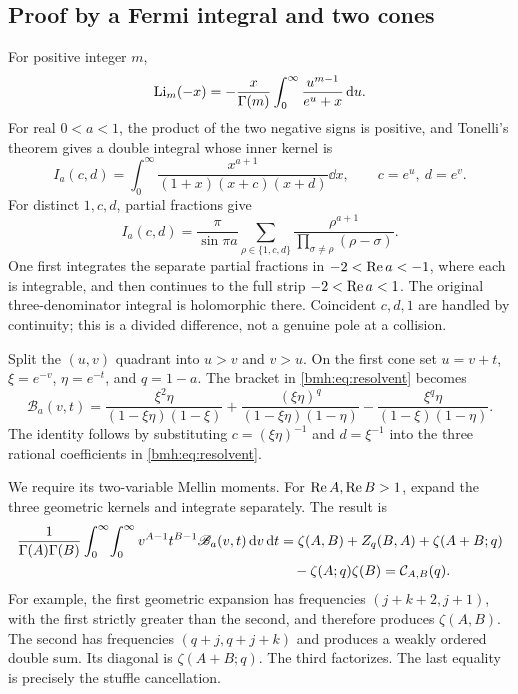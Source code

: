 \subsection{Proof by a Fermi integral and two cones}
For positive integer $m$,
\begin{equation}\label{bmh:eq:Fermi}
 \operatorname{Li}_m(-x)=-\frac{x}{\Gamma(m)}\int_0^\infty
             \frac{u^{m-1}}{e^u+x}\,\mathrm d u.
\end{equation}
For real $0<a<1$, the product of the two negative signs is positive,
and Tonelli's theorem gives a double integral whose inner kernel is
\[
 I_a(c,d)=\int_0^\infty
       \frac{x^{a+1}}{(1+x)(x+c)(x+d)}\dd x,
 \qquad c=e^u,\ d=e^v.
\]
For distinct $1,c,d$, partial fractions give
\begin{equation}\label{bmh:eq:resolvent}
 I_a(c,d)=\frac\pi{\sin\pi a}
 \sum_{\rho\in\{1,c,d\}}
       \frac{\rho^{a+1}}{\prod_{\sigma\ne\rho}(\rho-\sigma)}.
\end{equation}
One first integrates the separate partial fractions in
$-2<\operatorname{Re} a<-1$, where each is integrable, and then continues to the
full strip $-2<\operatorname{Re} a<1$. The original three-denominator integral is
holomorphic there. Coincident $c,d,1$ are handled by continuity; this is
a divided difference, not a genuine pole at a collision.

Split the $(u,v)$ quadrant into $u>v$ and $v>u$. On the first cone set
$u=v+t$, $\xi=e^{-v}$, $\eta=e^{-t}$, and $q=1-a$. The bracket in
\eqref{bmh:eq:resolvent} becomes
\begin{equation}\label{bmh:eq:cone-kernel}
 \mathscr B_a(v,t)=
 \frac{\xi^2\eta}{(1-\xi\eta)(1-\xi)}
 +\frac{(\xi\eta)^q}{(1-\xi\eta)(1-\eta)}
 -\frac{\xi^q\eta}{(1-\xi)(1-\eta)}.
\end{equation}
The identity follows by substituting $c=(\xi\eta)^{-1}$ and
$d=\xi^{-1}$ into the three rational coefficients in
\eqref{bmh:eq:resolvent}.

We require its two-variable Mellin moments. For $\operatorname{Re} A,\operatorname{Re} B>1$,
expand the three geometric kernels and integrate separately. The result is
\begin{align}
 \frac1{\Gamma(A)\Gamma(B)}\int_0^\infty\!\int_0^\infty
 v^{A-1}t^{B-1}\mathscr B_a(v,t)\,\mathrm d v\,\mathrm d t
 &=\zeta(A,B)+Z_q(B,A)+\zeta(A+B;q)\notag\\
 &\quad-\zeta(A;q)\zeta(B)
 =\mathcal C_{A,B}(q).
 \label{bmh:eq:cone-moment}
\end{align}
For example, the first geometric expansion has frequencies
$(j+k+2,j+1)$, with the first strictly greater than the second, and
therefore produces $\zeta(A,B)$. The second has frequencies
$(q+j,q+j+k)$ and produces a weakly ordered double sum. Its diagonal is
$\zeta(A+B;q)$. The third factorizes. The last equality is precisely the
stuffle cancellation.

